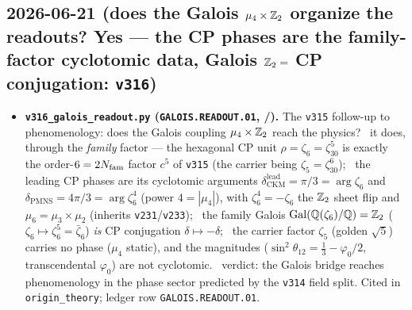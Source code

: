 \subsection*{2026-06-21 (does the Galois $\mu_4\times\mathbb{Z}_2$ organize the readouts? Yes --- the CP phases are the family-factor cyclotomic data, Galois $\mathbb{Z}_2=$ CP conjugation: \texttt{v316})}
\begin{itemize}
\item \textbf{\texttt{v316\_galois\_readout.py} (\texttt{GALOIS.READOUT.01}, \mE/\mC).} The \texttt{v315} follow-up to
  phenomenology: does the Galois coupling $\mu_4\times\mathbb{Z}_2$ reach the physics? \mE\ it does, through the \emph{family}
  factor --- the hexagonal CP unit $\rho=\zeta_6=\zeta_{30}^5$ is exactly the order-$6=2N_{\mathrm{fam}}$ factor $c^5$ of
  \texttt{v315} (the carrier being $\zeta_5=\zeta_{30}^6$); \mC\ the leading CP phases are its cyclotomic arguments
  $\delta_{\mathrm{CKM}}^{\mathrm{lead}}=\pi/3=\arg\zeta_6$ and $\delta_{\mathrm{PMNS}}=4\pi/3=\arg\zeta_6^4$ (power
  $4=|\mu_4|$), with $\zeta_6^4=-\zeta_6$ the $\mathbb{Z}_2$ sheet flip and $\mu_6=\mu_3\times\mu_2$ (inherits
  \texttt{v231}/\texttt{v233}); \mE\ the family Galois $\mathrm{Gal}(\mathbb Q(\zeta_6)/\mathbb Q)=\mathbb{Z}_2$
  ($\zeta_6\mapsto\zeta_6^5=\bar\zeta_6$) \emph{is} CP conjugation $\delta\mapsto-\delta$; \mE\ the carrier factor
  $\zeta_5$ (golden $\sqrt5$) carries no phase ($\mu_4$ static), and the magnitudes
  ($\sin^2\theta_{12}=\tfrac13-\varphi_0/2$, transcendental $\varphi_0$) are not cyclotomic. \mC\ verdict: the Galois
  bridge reaches phenomenology in the phase sector predicted by the \texttt{v314} field split. Cited in
  \texttt{origin\_theory}; ledger row \texttt{GALOIS.READOUT.01}.
\end{itemize}

